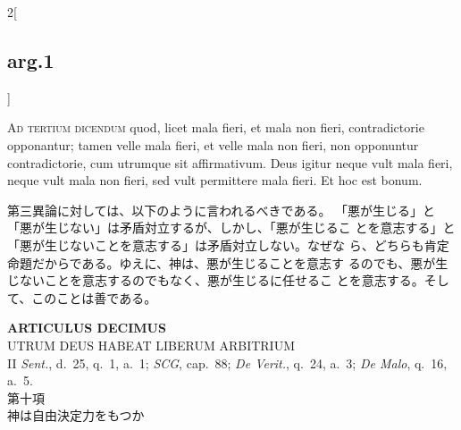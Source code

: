 \documentclass[paper=a4paper,fontsize=10pt,jafontsize=9pt,titlepage]{jlreq}
\begin{document}
\begin{paracol}{2}[\subsection{arg.1}]
\switchcolumn*[\subsection{ad.3}]


{\scshape Ad tertium dicendum} quod, licet mala fieri,
et mala non fieri, contradictorie opponantur; tamen velle mala fieri, et
velle mala non fieri, non opponuntur contradictorie, cum utrumque sit
affirmativum. Deus igitur neque vult mala fieri, neque vult mala non
fieri, sed vult permittere mala fieri. Et hoc est bonum.

\switchcolumn

第三異論に対しては、以下のように言われるべきである。
「悪が生じる」と「悪が生じない」は矛盾対立するが、しかし、「悪が生じるこ
 とを意志する」と「悪が生じないことを意志する」は矛盾対立しない。なぜな
 ら、どちらも肯定命題だからである。ゆえに、神は、悪が生じることを意志す
 るのでも、悪が生じないことを意志するのでもなく、悪が生じるに任せるこ
 とを意志する。そして、このことは善である。

\end{paracol}
\newpage

{}
\setcounter{section}{10}
\setcounter{subsection}{0}
\begin{center}
 {\Large {\bfseries ARTICULUS DECIMUS}}\\
 {\large UTRUM DEUS HABEAT LIBERUM ARBITRIUM}\\
 {\footnotesize II {\itshape Sent.}, d.~25, q.~1, a.~1; {\itshape SCG},
 cap.~88; {\itshape De Verit.}, q.~24, a.~3; {\itshape De Malo}, q.~16, a.~5.}\\
 {\Large 第十項\\神は自由決定力をもつか}
\end{center}
\end{document}
